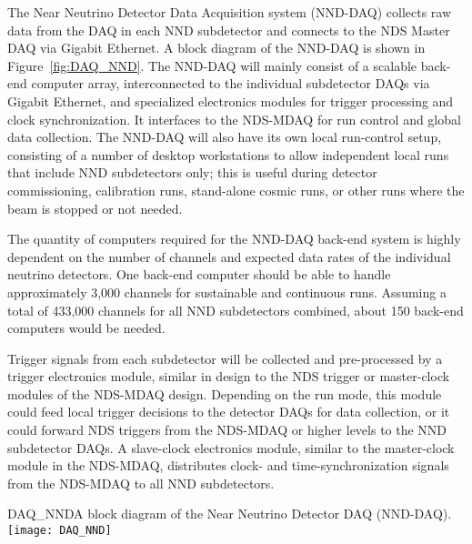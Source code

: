 
The Near Neutrino Detector Data Acquisition system (NND-DAQ) collects raw data from 
the DAQ in each %
NND subdetector and connects to the %
NDS Master DAQ via Gigabit Ethernet. A block diagram of the NND-DAQ is
shown in Figure~\ref{fig:DAQ_NND}. The NND-DAQ will mainly consist 
of a scalable back-end computer array, interconnected to the individual %
subdetector DAQs via Gigabit Ethernet, and specialized electronics modules for trigger 
processing and clock synchronization. It interfaces to the NDS-MDAQ for 
run control and global  data collection. The NND-DAQ will also have its own local run-control setup, 
consisting of a number of desktop workstations to allow independent local runs that include 
NND subdetectors only; this is useful during detector commissioning, calibration runs, 
stand-alone cosmic runs, or other runs where the beam is stopped or not needed.

The quantity of computers required for the NND-DAQ back-end system is highly dependent on the 
number of channels and expected data rates of the individual neutrino detectors. 
One back-end computer should be able to handle 
approximately 3,000 channels for sustainable and continuous runs. Assuming a total of 
433,000 channels for all NND subdetectors combined, about 150 back-end computers would be 
needed.

Trigger signals from each subdetector will be collected and pre-processed by a 
trigger electronics module, similar in design to the NDS  trigger or master-clock modules 
of the NDS-MDAQ design. Depending on the run mode, this module could feed local 
trigger 
decisions to the detector DAQs for data collection, or it could forward NDS triggers 
from the NDS-MDAQ or higher levels to the NND subdetector DAQs.  A slave-clock electronics 
module, similar to the master-clock module in the NDS-MDAQ, distributes clock- and 
time-synchronization signals from the NDS-MDAQ to all NND subdetectors.


\begin{cdrfigure}{DAQ_NND}{A block diagram of the Near Neutrino Detector DAQ (NND-DAQ).}
\texttt{[image: DAQ\_NND]}
\end{cdrfigure}


